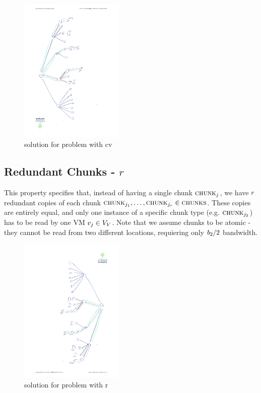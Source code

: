 \begin{figure}
 
\includegraphics[angle=270,origin=c, height=7cm]{figs/model_fig_skteches/cv}
\caption{solution for problem with cv}
\end{figure}



\subsection{Redundant Chunks - $r$}

This property specifies that, instead of having a single chunk $\textsc{chunk}_j$, we 
have $r$ redundant copies of each chunk 
$\textsc{chunk}_{j_1},\dots,\textsc{chunk}_{j_{r}}  \in \textsc{chunks}$. These copies are 
entirely equal, and only one instance of a specific chunk type (e.g. 
$\textsc{chunk}_{j_2}$) has to be read by one VM $v_j \in V_V$. 
Note that we assume chunks to be atomic - they cannot be read from two different 
locations, requiering only $b_2 / 2$  bandwidth.

\begin{figure}
 
\includegraphics[angle=90,origin=c, height=7cm]{figs/model_fig_skteches/r_cv}
\caption{solution for problem with r}
\end{figure}




